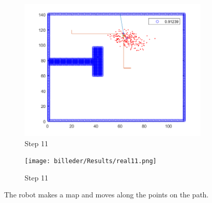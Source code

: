 \begin{figure}[H]
\begin{subfigure}{.5\textwidth}
  \centering
  \includegraphics[width=.8\linewidth]{billeder/Results/11.png}
  \caption{Step 11}
  \label{ResultDriveFig2:sub5}
\end{subfigure}%
\begin{subfigure}{.5\textwidth}
  \centering
  \texttt{[image: billeder/Results/real11.png]}
  \caption{Step 11}
  \label{ResultDriveFig2:sub6}
\end{subfigure}
\caption{The robot makes a map and moves along the points on the path.}
\label{ResultDriveFig2}
\end{figure}

